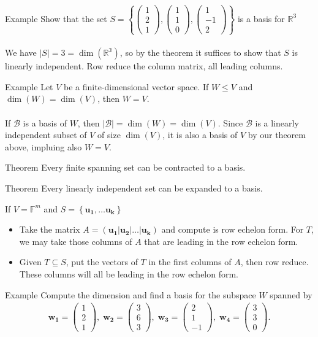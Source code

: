 \documentclass{report}
\renewcommand{\vec}{\mathbf}
\newcommand{\Dim}{\operatorname{dim}}
\newcommand{\cvec}[1]{ \begin{pmatrix} #1 \end{pmatrix} }
\begin{document}
\begin{enumerate}
		\begin{question}{Example}
			Show that the set $S = \left\{ \cvec{1\\2\\1}, \cvec{1\\1\\0}, \cvec{1\\-1\\2} \right\}$ is a basis for $\mathbb{R}^3$
			\\ \\
			We have $|S| = 3 = \operatorname{dim}(\mathbb{R^3})$, so by the theorem it suffices to show that $S$ is linearly independent. Row reduce the column matrix, all leading columns.
		\end{question}

		\begin{question}{Example}
			Let $V$ be a finite-dimensional vector space. If $W \leq V$ and $\Dim(W) = \Dim(V)$, then $W = V$.
			\\ \\
			If $\mathcal{B}$ is a basis of $W$, then $|\mathcal{B}| = \Dim(W) = \Dim(V)$. Since $\mathcal{B}$ is a linearly independent subset of $V$ of size $\Dim(V)$, it is also a basis of $V$ by our theorem above, impluing also $W = V$.
			
		\end{question}

		\begin{question}{Theorem}
			Every finite spanning set can be contracted to a basis.
		\end{question}

		\begin{question}{Theorem}
			Every linearly independent set can be expanded to a basis.
		\end{question}

		If $V = \mathbb{F}^m$ and $S = \left\{\vec{u_1}, \dots \vec{u_k}\right\}$
		\begin{itemize}
			\item Take the matrix $A = (\vec{u_1}|\vec{u_2}|\dots|\vec{u_k})$ and compute is row echelon form. For $T$, we may take those columns of $A$ that are leading in the row echelon form.
			\item Given $T \subseteq S$, put the vectors of $T$ in the first columns of $A$, then row reduce. These columns will all be leading in the row echelon form.
		\end{itemize}

		\begin{question}{Example}
			Compute the dimension and find a basis for the subspace $W$ spanned by
				\begin{align*}
					\vec{w_1} = \cvec{1\\2\\1}, \; \vec{w_2} = \cvec{3\\6\\3}, \; \vec{w_3} = \cvec{2\\1\\-1}, \; \vec{w_4} = \cvec{3\\3\\0}.
				\end{align*}


\end{question}
\end{enumerate}
\end{document}
